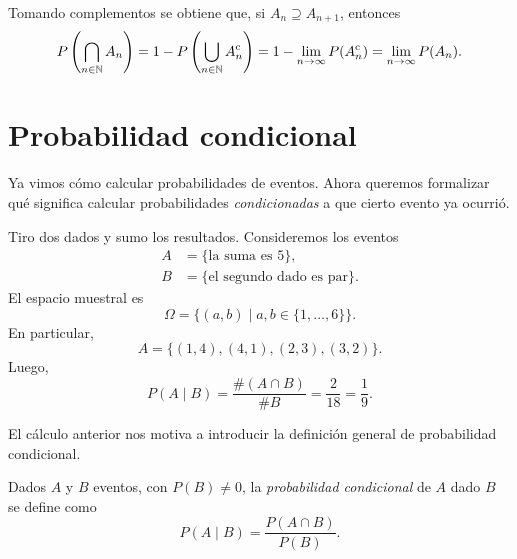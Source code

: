 \begin{corollary}
    Tomando complementos se obtiene que, si $A_n \supseteq A_{n+1}$, entonces
    \begin{equation*}
        P\left(\bigcap_{n \in \mathbb{N}} A_n\right)
        = 1 - P\left(\bigcup_{n \in \mathbb{N}} A_n^{\mathrm{c}}\right)
        = 1 - \lim_{n \to \infty} P(A_n^{\mathrm{c}})
        = \lim_{n \to \infty} P(A_n).
    \end{equation*}
\end{corollary}

\section{Probabilidad condicional}

Ya vimos cómo calcular probabilidades de eventos. Ahora queremos formalizar qué significa calcular probabilidades \textit{condicionadas} a que cierto evento ya ocurrió.

\begin{example}
    Tiro dos dados y sumo los resultados. Consideremos los eventos
    \begin{align*}
        A &= \{\text{la suma es $5$}\}, \\
        B &= \{\text{el segundo dado es par}\}.
    \end{align*}
    El espacio muestral es
    \begin{equation*}
        \Omega = \{(a,b) \mid a,b \in \{1,\ldots,6\}\}.
    \end{equation*}
    En particular,
    \begin{equation*}
        A = \{(1,4),(4,1),(2,3),(3,2)\}.
    \end{equation*}
    Luego,
    \begin{equation*}
        P(A \mid B) = \frac{\# (A \cap B)}{\# B} = \frac{2}{18} = \frac{1}{9}.
    \end{equation*}
\end{example}

El cálculo anterior nos motiva a introducir la definición general de probabilidad condicional.

\begin{definition}
    Dados $A$ y $B$ eventos, con $P(B) \neq 0$, la \emph{probabilidad condicional} de $A$ dado $B$ se define como
    \begin{equation*}
        P(A \mid B) = \frac{P(A \cap B)}{P(B)}.
    \end{equation*}
\end{definition}

